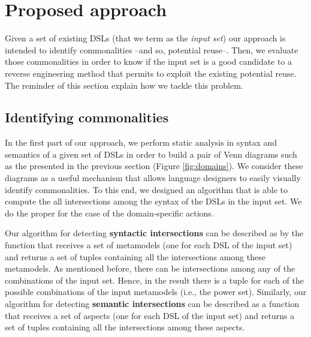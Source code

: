 \section{Proposed approach}

Given a set of existing DSLs (that we term as the \textit{input set}) our approach is intended to identify commonalities --and so, potential reuse--. Then, we evaluate those commonalities in order to know if the input set is a good candidate to a reverse engineering method that permits to exploit the existing potential reuse. The reminder of this section explain how we tackle this problem.

\subsection{Identifying commonalities}
\label{sec:metrics}

In the first part of our approach, we perform static analysis in syntax and semantics of a given set of DSLs in order to build a pair of Venn diagrams such as the presented in the previous section (Figure \ref{fig:domains}). We consider these diagrams as a useful mechanism that allows language designers to easily visually identify commonalities. To this end, we designed an algorithm that is able to compute the all intersections among the syntax of the DSLs in the input set. We do the proper for the case of the domain-specific actions. 

Our algorithm for detecting \textbf{syntactic intersections} can be described as by the function that receives a set of metamodels (one for each DSL of the input set) and returns a set of tuples containing all the intersections among these metamodels. As mentioned before, there can be intersections among any of the combinations of the input set. Hence, in the result there is a tuple for each of the possible combinations of the input metamodels (i.e., the power set). Similarly, our algorithm for detecting \textbf{semantic intersections} can be described as a function that receives a set of aspects (one for each DSL of the input set) and returns a set of tuples containing all the intersections among these aspects. 



